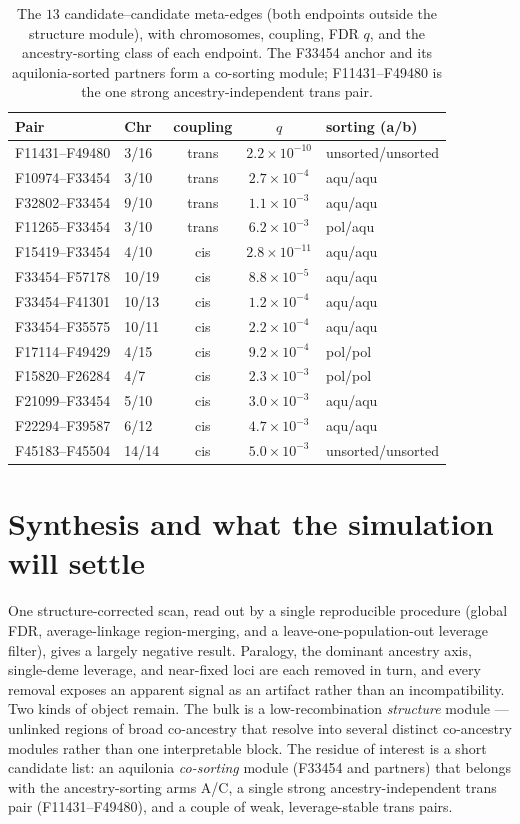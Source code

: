 \documentclass[11pt]{article}
\begin{document}
\begin{table}[h]
\centering
\caption{The $13$ candidate--candidate meta-edges (both endpoints outside the structure
module), with chromosomes, coupling, FDR $q$, and the ancestry-sorting class of each
endpoint. The F33454 anchor and its aquilonia-sorted partners form a co-sorting module;
F11431--F49480 is the one strong ancestry-independent trans pair.}
\label{tab:cand}
\small\setlength{\tabcolsep}{5pt}
\begin{tabular}{llccl}
\toprule
Pair & Chr & coupling & $q$ & sorting (a/b) \\
\midrule
F11431--F49480 & 3/16  & trans & $2.2\times10^{-10}$ & unsorted/unsorted \\
F10974--F33454 & 3/10  & trans & $2.7\times10^{-4}$  & aqu/aqu \\
F32802--F33454 & 9/10  & trans & $1.1\times10^{-3}$  & aqu/aqu \\
F11265--F33454 & 3/10  & trans & $6.2\times10^{-3}$  & pol/aqu \\
F15419--F33454 & 4/10  & cis   & $2.8\times10^{-11}$ & aqu/aqu \\
F33454--F57178 & 10/19 & cis   & $8.8\times10^{-5}$  & aqu/aqu \\
F33454--F41301 & 10/13 & cis   & $1.2\times10^{-4}$  & aqu/aqu \\
F33454--F35575 & 10/11 & cis   & $2.2\times10^{-4}$  & aqu/aqu \\
F17114--F49429 & 4/15  & cis   & $9.2\times10^{-4}$  & pol/pol \\
F15820--F26284 & 4/7   & cis   & $2.3\times10^{-3}$  & pol/pol \\
F21099--F33454 & 5/10  & cis   & $3.0\times10^{-3}$  & aqu/aqu \\
F22294--F39587 & 6/12  & cis   & $4.7\times10^{-3}$  & aqu/aqu \\
F45183--F45504 & 14/14 & cis   & $5.0\times10^{-3}$  & unsorted/unsorted \\
\bottomrule
\end{tabular}
\end{table}

\section{Synthesis and what the simulation will settle}
\label{sec:synth}

One structure-corrected scan, read out by a single reproducible procedure (global FDR,
average-linkage region-merging, and a leave-one-population-out leverage filter), gives a
largely negative result. Paralogy, the dominant ancestry axis, single-deme leverage, and
near-fixed loci are each removed in turn, and every removal exposes an apparent signal as
an artifact rather than an incompatibility. Two kinds of object remain. The bulk is a
low-recombination \emph{structure} module --- unlinked regions of broad co-ancestry that
resolve into several distinct co-ancestry modules rather than one interpretable block. The
residue of interest is a short candidate list: an aquilonia \emph{co-sorting} module
(F33454 and partners) that belongs with the ancestry-sorting arms A/C, a single strong
ancestry-independent trans pair (F11431--F49480), and a couple of weak, leverage-stable
trans pairs.
\end{document}
